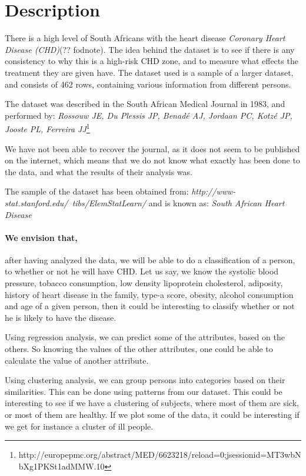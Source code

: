 \section{Description}
There is a high level of South Africans with the heart disease \textit{Coronary Heart Disease (CHD)}(?? fodnote). The idea behind the dataset is to see if there is any consistency to why this is a high-risk CHD zone, and to measure what effects the treatment they are given have. The dataset used is a sample of a larger dataset, and consists of 462 rows, containing various information from different persons.

The dataset was described in the South African Medical Journal in 1983, and performed by: \textit{Rossouw JE, Du Plessis JP, Benadé AJ, Jordaan PC, Kotzé JP, Jooste PL, Ferreira JJ}\footnote{http://europepmc.org/abstract/MED/6623218/reload=0;jsessionid=MT3wbNbXg1PKSt1adMMW.10}

We have not been able to recover the journal, as it does not seem to be published on the internet, which means that we do not know what exactly has been done to the data, and what the results of their analysis was.

The sample of the dataset has been obtained from: \textit{http://www-stat.stanford.edu/~tibs/ElemStatLearn/} and is known as: \textit{South African Heart Disease}

\paragraph{We envision that,} after having analyzed the data, we will be able to do a classification of a person, to whether or not he will have CHD. Let us say, we know the systolic blood pressure, tobacco consumption, low density lipoprotein cholesterol, adiposity, history of heart disease in the family, type-a score, obesity, alcohol consumption and age of a given person, then it could be interesting to classify whether or not he is likely to have the disease.%

Using regression analysis, we can predict some of the attributes, based on the others. So knowing the values of the other attributes, one could be able to calculate the value of another attribute.%

Using clustering analysis, we can group persons into categories based on their similarities. This can be done using patterns from our dataset. This could be interesting to see if we have a clustering of subjects, where most of them are sick, or most of them are healthy. If we plot some of the data, it could be interesting if we get for instance a cluster of ill people.

